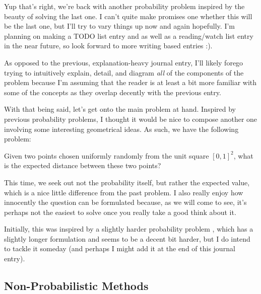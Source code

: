 Yup that's right, we're back with another probability problem
 inspired
by the beauty of solving the last one. I can't quite make promises one whether
this will be the last one, but I'll try to vary things up now and again
hopefully. I'm planning on making a TODO list entry and as well as a
reading/watch list entry in the near future, so look forward to more writing
based entries :).

As opposed to the previous, explanation-heavy journal entry, I'll likely forego
trying to intuitively explain, detail, and diagram \textit{all} of the
components of the problem because I'm assuming that the reader is at least a
bit more familiar with some of the concepts as they overlap decently with the
previous entry.

With that being said, let's get onto the main problem at hand. Inspired by
previous probability problems, I thought it would be nice to compose another
one involving some interesting geometrical ideas. As such, we have the
following problem:
\begin{blackbox}
    \begin{problem}
        Given two points chosen uniformly randomly from the unit square \(
        \left[ 0, 1 \right]^2 \), what is the expected distance between these
        two points?
    \end{problem}
\end{blackbox}
This time, we seek out not the probability itself, but rather the expected
value, which is a nice little difference from the past problem. I also really
enjoy how innocently the question can be formulated because, as we will come to
see, it's perhaps not the easiest  to solve once you really
take a good think about it.

Initially, this was inspired by a slightly harder probability problem
,
which has a slightly longer formulation and seems to be a decent bit harder,
but I do intend to tackle it someday (and perhaps I might add it at the end of
this journal entry).

\subsection{Non-Probabilistic Methods}

